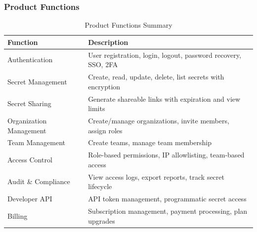 \documentclass[12pt,a4paper]{article}
\begin{document}
\subsubsection{Product Functions}
\begin{table}[H]
  \centering
  \small
  \caption{Product Functions Summary}
  \begin{tabular}{@{}p{3.5cm}p{9cm}@{}}
    \toprule
    \textbf{Function}       & \textbf{Description}                                          \\
    \midrule
    Authentication          & User registration, login, logout, password recovery, SSO, 2FA \\
    \hline
    Secret Management       & Create, read, update, delete, list secrets with encryption    \\
    \hline
    Secret Sharing          & Generate shareable links with expiration and view limits      \\
    \hline
    Organization Management & Create/manage organizations, invite members, assign roles     \\
    \hline
    Team Management         & Create teams, manage team membership                          \\
    \hline
    Access Control          & Role-based permissions, IP allowlisting, team-based access    \\
    \hline
    Audit \& Compliance     & View access logs, export reports, track secret lifecycle      \\
    \hline
    Developer API           & API token management, programmatic secret access              \\
    \hline
    Billing                 & Subscription management, payment processing, plan upgrades    \\
    \bottomrule
  \end{tabular}
\end{table}
\end{document}
